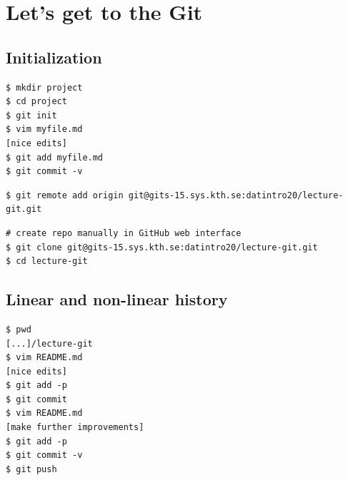 \section{Let's get to the Git}

\subsection{Initialization}

\begin{frame}[fragile]
  \begin{example}[No remote]
    \begin{lstlisting}
$ mkdir project
$ cd project
$ git init
$ vim myfile.md
[nice edits]
$ git add myfile.md
$ git commit -v
    \end{lstlisting}
  \end{example}

  \pause

  \begin{example}
    \begin{lstlisting}
$ git remote add origin git@gits-15.sys.kth.se:datintro20/lecture-git.git
    \end{lstlisting}
  \end{example}
\end{frame}

\begin{frame}[fragile]
  \begin{example}
    \begin{lstlisting}
# create repo manually in GitHub web interface
$ git clone git@gits-15.sys.kth.se:datintro20/lecture-git.git
$ cd lecture-git
    \end{lstlisting}
  \end{example}
\end{frame}

\subsection{Linear and non-linear history}

\begin{frame}[fragile]
  \begin{example}[Linear]
    \begin{lstlisting}
$ pwd
[...]/lecture-git
$ vim README.md
[nice edits]
$ git add -p
$ git commit
$ vim README.md
[make further improvements]
$ git add -p
$ git commit -v
$ git push
    \end{lstlisting}
  \end{example}
\end{frame}


